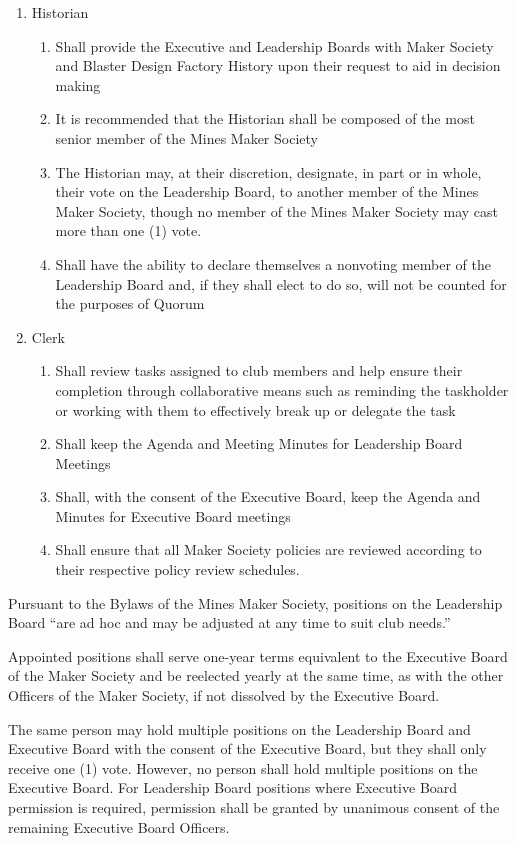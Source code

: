 \documentclass[12pt,letterpaper]{article}
\begin{document}
\begin{enumerate}
    \item Historian 
    \begin{enumerate}
        \item Shall provide the Executive and Leadership Boards with Maker Society and Blaster Design Factory History upon their request to aid in decision making
        \item It is recommended that the Historian shall be composed of the most senior member of the Mines Maker Society
        \item The Historian may, at their discretion, designate, in part or in whole, their vote on the Leadership Board, to another member of the Mines Maker Society, though no member of the Mines Maker Society may cast more than one (1) vote.
        \item Shall have the ability to declare themselves a nonvoting member of the Leadership Board and, if they shall elect to do so, will not be counted for the purposes of Quorum
    \end{enumerate}

    \item Clerk
    \begin{enumerate}
        \item Shall review tasks assigned to club members and help ensure their completion through collaborative means such as reminding the taskholder or working with them to effectively break up or delegate the task
        \item Shall keep the Agenda and Meeting Minutes for Leadership Board Meetings
        \item Shall, with the consent of the Executive Board, keep the Agenda and Minutes for Executive Board meetings
        \item Shall ensure that all Maker Society policies are reviewed according to their respective policy review schedules.
    \end{enumerate}
\end{enumerate}


Pursuant to the Bylaws of the Mines Maker Society, 
positions on the Leadership Board “are ad hoc and may be adjusted at any time to suit club needs.” 

Appointed positions shall serve one-year terms equivalent to the Executive Board of the Maker Society and be reelected yearly at the same time, 
as with the other Officers of the Maker Society, 
if not dissolved by the Executive Board.

The same person may hold multiple positions on the Leadership Board and Executive Board with the consent of the Executive Board, 
but they shall only receive one (1) vote. 
However, 
no person shall hold multiple positions on the Executive Board. 
For Leadership Board positions where Executive Board permission is required, 
permission shall be granted by unanimous consent of the remaining Executive Board Officers.
\end{document}

